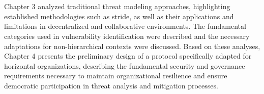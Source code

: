 \section*{} 
Chapter 3 analyzed traditional threat modeling approaches, highlighting
established methodologies such as \gls{stride}, as well as their applications and
limitations in decentralized and collaborative environments. The fundamental
categories used in vulnerability identification were described and the necessary
adaptations for non-hierarchical contexts were discussed. Based on these
analyses, Chapter 4 presents the preliminary design of a protocol specifically
adapted for horizontal organizations, describing the fundamental security and
governance requirements necessary to maintain organizational resilience and
ensure democratic participation in threat analysis and mitigation processes.

